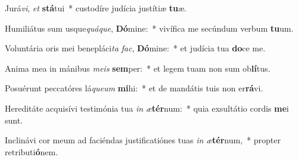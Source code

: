 \item Jurá\textit{vi}, \textit{et} \textbf{stá}tui~* custodíre judícia justítiæ \textbf{tu}æ.
\item Humiliátus sum usque\textit{quá}\textit{que}, \textbf{Dó}mine:~* vivífica me secúndum verbum \textbf{tu}um.
\item Voluntária oris mei benepláci\textit{ta} \textit{fac}, \textbf{Dó}mine:~* et judícia tua \textbf{do}ce me.
\item Anima mea in mánibus \textit{me}\textit{is} \textbf{sem}per:~* et legem tuam non sum ob\textbf{lí}tus.
\item Posuérunt peccatóres lá\textit{que}\textit{um} \textbf{mi}hi:~* et de mandátis tuis non er\textbf{rá}vi.
\item Hereditáte acquisívi testimónia tua \textit{in} \textit{æ}\textbf{tér}num:~* quia exsultátio cordis \textbf{me}i sunt.
\item Inclinávi cor meum ad faciéndas justificatiónes tuas \textit{in} \textit{æ}\textbf{tér}num,~* propter retributi\textbf{ó}nem.
